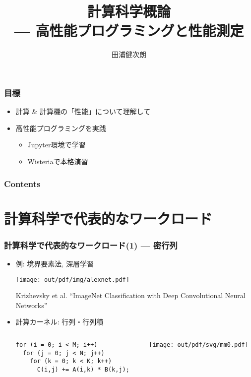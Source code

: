 \documentclass[10pt,dvipdfmx]{beamer}
\title{計算科学概論 \\
  --- 高性能プログラミングと性能測定}
\institute{工学部 電子情報工学科 \\
  情報理工学系研究科 電子情報学専攻 \\
  情報基盤センター}
\author{田浦健次朗}
\date{}
\begin{document}
\maketitle

\begin{frame}
\frametitle{目標}

\begin{itemize}
\item 計算 \& 計算機の「性能」について理解して
\item 高性能プログラミングを実践
  \begin{itemize}
  \item Jupyter環境で学習
  \item Wisteriaで本格演習
  \end{itemize}

\end{itemize}
\end{frame}

\begin{frame}
\frametitle{Contents}
\tableofcontents
\end{frame}

\section{計算科学で代表的なワークロード}

\begin{frame}[fragile]
\frametitle{計算科学で代表的なワークロード(1) --- 密行列}
\begin{itemize}
\item 例: 境界要素法, 深層学習
  \begin{center}
  \texttt{[image: out/pdf/img/alexnet.pdf]}
  
  {\tiny Krizhevsky et al. ``ImageNet Classification with Deep Convolutional Neural Networks''}
  \end{center}

\item 計算カーネル: 行列・行列積
\begin{columns}
\begin{column}{0.5\textwidth}
\begin{lstlisting}
for (i = 0; i < M; i++)    
  for (j = 0; j < N; j++)    
    for (k = 0; k < K; k++)
      C(i,j) += A(i,k) * B(k,j); 
\end{lstlisting}
\end{column}
\begin{column}{0.5\textwidth}
\texttt{[image: out/pdf/svg/mm0.pdf]}
\end{column}
\end{columns}
\end{itemize}
\end{frame}
\end{document}
